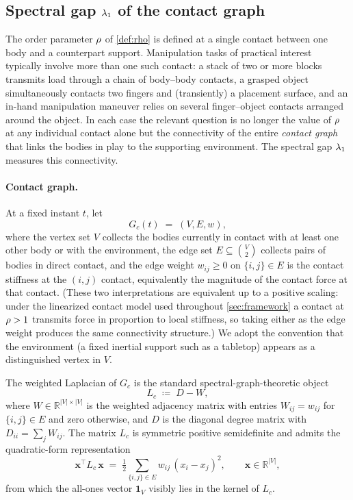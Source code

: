 \subsection{Spectral gap $\lambda_{1}$ of the contact graph}
\label{sec:specgap}

The order parameter $\rho$ of \cref{def:rho} is defined at a
single contact between one body and a counterpart support.
Manipulation tasks of practical interest
typically involve more than one such contact: a stack of two or
more blocks transmits load through a chain of body--body
contacts, a grasped object simultaneously contacts two fingers
and (transiently) a placement surface, and an in-hand
manipulation maneuver relies on several finger--object contacts
arranged around the object. In each case the relevant question
is no longer the value of $\rho$ at any individual contact
alone but the connectivity of the entire \emph{contact graph}
that links
the bodies in play to the supporting environment. The spectral
gap $\lambda_{1}$ measures this connectivity.

\paragraph{Contact graph.}
At a fixed instant $t$, let
\begin{equation}
\label{eq:contact-graph}
  G_{c}(t) \;=\; (V, E, w),
\end{equation}
where the vertex set $V$ collects the bodies currently in
contact with at least one other body or with the environment,
the edge set $E \subseteq \binom{V}{2}$ collects pairs of
bodies in direct contact, and the edge weight
$w_{ij} \ge 0$ on $\{i, j\} \in E$ is the contact stiffness at
the $(i, j)$ contact, equivalently the magnitude of the contact
force at that contact. (These two interpretations are
equivalent up to a positive scaling: under the linearized
contact model used throughout \cref{sec:framework} a contact at
$\rho > 1$ transmits force in proportion to local stiffness,
so taking either as the edge weight produces the
same connectivity structure.) We adopt the convention that the
environment (a fixed inertial support such as a tabletop)
appears as a distinguished vertex in $V$.

The weighted Laplacian of $G_{c}$ is the standard
spectral-graph-theoretic object
\begin{equation}
\label{eq:laplacian-def}
  L_{c} \;\coloneqq\; D - W,
\end{equation}
where $W \in \mathbb{R}^{|V| \times |V|}$ is the weighted
adjacency matrix with entries $W_{ij} = w_{ij}$ for $\{i, j\}
\in E$ and zero otherwise, and $D$ is the diagonal degree
matrix with $D_{ii} = \sum_{j} W_{ij}$. The matrix $L_{c}$ is
symmetric positive semidefinite and admits the quadratic-form
representation
\begin{equation}
\label{eq:laplacian-quadform}
  \mathbf{x}^{\top} L_{c}\, \mathbf{x}
  \;=\; \tfrac{1}{2}\!\sum_{\{i, j\} \in E}\! w_{ij}\,(x_{i} - x_{j})^{2},
  \qquad \mathbf{x} \in \mathbb{R}^{|V|},
\end{equation}
from which the all-ones vector $\mathbf{1}_{V}$ visibly lies in
the kernel of $L_{c}$.

